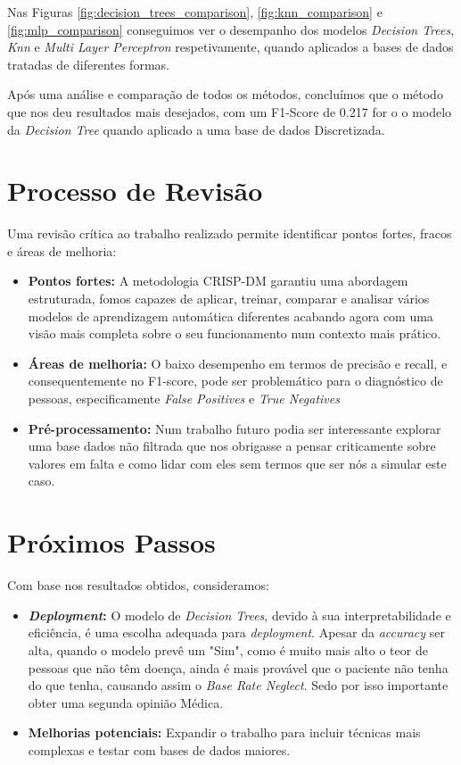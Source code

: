 Nas Figuras \ref{fig:decision_trees_comparison}, \ref{fig:knn_comparison} e \ref{fig:mlp_comparison} conseguimos ver o desempanho dos modelos \textit{Decision Trees}, \textit{Knn} e \textit{Multi Layer Perceptron} respetivamente, quando aplicados a bases de dados tratadas de diferentes formas.

Após uma análise e comparação de todos os métodos, concluímos que o método que nos deu resultados mais desejados, com um F1-Score de 0.217 for o o modelo da \textit{Decision Tree} quando aplicado a uma base de dados Discretizada.

\section{Processo de Revisão}
\label{chap:ev:review}

Uma revisão crítica ao trabalho realizado permite identificar pontos fortes, fracos e áreas de melhoria:
\begin{itemize}
    \item \textbf{Pontos fortes:} A metodologia CRISP-DM garantiu uma abordagem estruturada, fomos capazes de aplicar, treinar, comparar e analisar vários modelos de aprendizagem automática diferentes acabando agora com uma visão mais completa sobre o seu funcionamento num contexto mais prático.
    \item \textbf{Áreas de melhoria:} O baixo desempenho em termos de precisão e recall, e consequentemente no F1-score, pode ser problemático para o diagnóstico de pessoas, especificamente \textit{False Positives} e \textit{True Negatives}
    \item \textbf{Pré-processamento:} Num trabalho futuro podia ser interessante explorar uma base dados não filtrada que nos obrigasse a pensar criticamente sobre valores em falta e como lidar com eles sem termos que ser nós a simular este caso.
\end{itemize}

\section{Próximos Passos}
\label{chap:ev:next_steps}

Com base nos resultados obtidos, consideramos:
\begin{itemize}
    \item \textbf{\textit{Deployment}:} O modelo de \textit{Decision Trees}, devido à sua interpretabilidade e eficiência, é uma escolha adequada para \textit{deployment}. Apesar da \textit{accuracy} ser alta, quando o modelo prevê um "Sim", como é muito mais alto o teor de pessoas que não têm doença, ainda é mais provável que o paciente não tenha do que tenha, causando assim o \textit{Base Rate Neglect}\cite{wikipedia_base_rate_fallacy}. Sedo por isso importante obter uma segunda opinião Médica. 
    \item \textbf{Melhorias potenciais:} Expandir o trabalho para incluir técnicas mais complexas e testar com bases de dados maiores.
\end{itemize}
